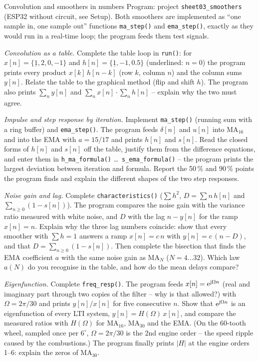 \begin{exercise}{Convolution and smoothers in numbers}{\Wokwi}
Program: project \texttt{sheet03\_smoothers} (ESP32 without circuit, see
Setup). Both smoothers are implemented as ``one sample in, one sample out''
functions \texttt{ma\_step()} and \texttt{ema\_step()}, exactly as they would
run in a real-time loop; the program feeds them test signals.
\begin{tasks}
  \item \emph{Convolution as a table.} Complete the table loop in \texttt{run()}:
    for $x[n]=\{\underline{1},2,0,-1\}$ and $h[n]=\{\underline{1},-1,0.5\}$
    (underlined: $n=0$) the program prints every product $x[k]\,h[n-k]$
    (row $k$, column $n$) and the column sums $y[n]$. Relate the table to the
    graphical method (flip and shift $h$). The program also prints
    $\sum_n y[n]$ and $\sum_n x[n]\cdot\sum_n h[n]$ -- explain why the two
    must agree.
  \item \emph{Impulse and step response by iteration.} Implement
    \texttt{ma\_step()} (running sum with a ring buffer) and
    \texttt{ema\_step()}. The program feeds $\delta[n]$ and $u[n]$ into MA$_{16}$
    and into the EMA with $a=15/17$ and prints $h[n]$ and $s[n]$. Read the
    closed forms of $h[n]$ and $s[n]$ off the table, justify them from the
    difference equations, and enter them in \texttt{h\_ma\_formula()} \dots\
    \texttt{s\_ema\_formula()} -- the program prints the largest deviation
    between iteration and formula. Report the 50\,\% and 90\,\% points the
    program finds and explain the different shapes of the two step responses.
  \item \emph{Noise gain and lag.} Complete \texttt{characteristics()}
    ($\sum h^2$, $D=\sum n\,h[n]$ and $\sum_{n\ge0}(1-s[n])$). The program
    compares the noise gain with the variance ratio measured with white noise,
    and $D$ with the lag $n-y[n]$ for the ramp $x[n]=n$. Explain why the three
    lag numbers coincide: show that every smoother with $\sum h=1$ answers a
    ramp $x[n]=c\,n$ with $y[n]=c\,(n-D)$, and that $D=\sum_{n\ge0}(1-s[n])$.
    Then complete the bisection that finds the EMA coefficient $a$ with the
    same noise gain as MA$_N$ ($N=4\dots32$). Which law $a(N)$ do you recognise
    in the table, and how do the mean delays compare?
  \item \emph{Eigenfunction.} Complete \texttt{freq\_resp()}. The program feeds
    $x[n]=\mathrm{e}^{\mathrm{j}\Omega n}$ (real and imaginary part through two copies of the
    filter -- why is that allowed?) with $\Omega=2\pi/30$ and prints
    $y[n]/x[n]$ for five consecutive $n$. Show that $\mathrm{e}^{\mathrm{j}\Omega n}$ is an
    eigenfunction of every LTI system, $y[n]=H(\Omega)\,x[n]$, and compare the
    measured ratios with $H(\Omega)$ for MA$_{16}$, MA$_{30}$ and the EMA.
    (On the 60-tooth wheel, sampled once per $6^\circ$, $\Omega=2\pi/30$ is the
    2nd engine order -- the speed ripple caused by the combustions.) The
    program finally prints $|H|$ at the engine orders 1--6: explain the zeros
    of MA$_{30}$.
\end{tasks}
\end{exercise}

